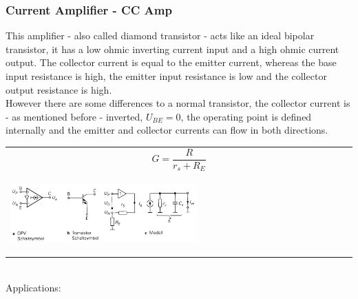 		\subsubsection{Current Amplifier - CC Amp}
			This amplifier - also called diamond transistor - acts like an ideal bipolar transistor, it has a low ohmic inverting current input and a high ohmic current output. The collector current is equal to the emitter current, whereas the base input resistance is high, the emitter input resistance is low and the collector output resistance is high. \\
			However there are some differences to a normal transistor, the collector current is - as mentioned before - inverted, $U_{BE} = 0$, the operating point is defined internally and the emitter and collector currents can flow in both directions.  
			\begin{table}[h!]
				\centering
				\begin{tabular}{m{}}
					
					\begin{equation}
						G = \frac{R}{r_s+R_E}
					\end{equation}	

				\\
							
					\begin{center}\includegraphics[width=0.55\textwidth]{images/CurrentAmp.png}\end{center} 
				\\
			
				\end{tabular}
			\end{table}
			\\
			Applications: \\
